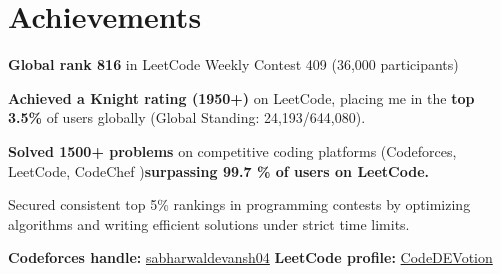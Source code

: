 \documentclass[letterpaper,11pt]{article}\renewcommand{\baselinestretch}{0.95}
\begin{document}
\section{\Large Achievements}
\begin{itemize}[leftmargin=0.15in, label={$\bullet$},itemsep=0pt]
    \item {\textbf{Global rank 816 }in LeetCode Weekly Contest 409 (36,000 participants)}\\
    \item {\textbf{Achieved a Knight rating (1950+)} on LeetCode, placing me in the\textbf{ top 3.5\%} of users globally (Global Standing: 24,193/644,080). 
    \item {\textbf{Solved 1500+ problems} on competitive coding platforms (Codeforces, LeetCode, CodeChef )\textbf{surpassing 99.7 \% of users on LeetCode.} }
    \item {Secured consistent top 5\% rankings in programming contests by optimizing algorithms and writing efficient solutions under strict time limits.}
     \item {\textbf{Codeforces handle:} \href{https://codeforces.com/profile/sabharwaldevansh04}{sabharwaldevansh04}}
      {\textbf{  LeetCode profile:} \href{https://leetcode.com/u/CodeDEVotion/}{CodeDEVotion}}}

 \end{itemize}
\end{document}
